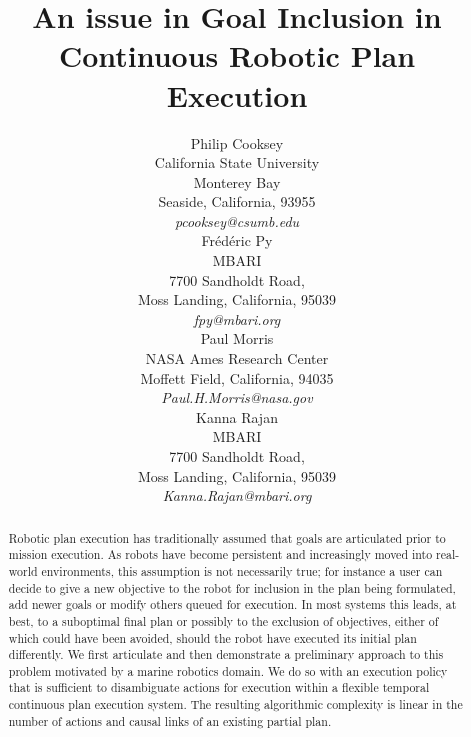 \documentclass[letterpaper]{article}
\begin{document}
\title{An issue in Goal Inclusion in Continuous Robotic Plan Execution}
\author{Philip Cooksey\\
\small{California State University}\\ 
\small{Monterey Bay}\\
\small{Seaside, California, 93955}\\
\small{\emph{pcooksey@csumb.edu}}\\
\And Fr\'ed\'eric Py\\
\small{MBARI}\\
\small{7700 Sandholdt Road,}\\
\small{Moss Landing, California, 95039}\\
\small{\emph{fpy@mbari.org}}\\
\And Paul Morris\\
\small{NASA Ames Research Center}\\
\small{Moffett Field, California, 94035}\\
\small{\emph{Paul.H.Morris@nasa.gov}}\\
\And Kanna Rajan\\
\small{MBARI}\\
\small{7700 Sandholdt Road,}\\
\small{Moss Landing, California, 95039}\\
\small{\emph{Kanna.Rajan@mbari.org}}\\
}

\maketitle{}

\begin{abstract}

  Robotic plan execution has traditionally assumed that goals are
  articulated prior to mission execution. As robots have become
  persistent and increasingly moved into real-world environments, this
  assumption is not necessarily true; for instance a user can decide
  to give a new objective to the robot for inclusion in the plan being
  formulated, add newer goals or modify others queued for
  execution. In most systems this leads, at best, to a suboptimal
  final plan or possibly to the exclusion of objectives, either of
  which could have been avoided, should the robot have executed its
  initial plan differently.  We first articulate and then demonstrate
  a preliminary approach to this problem motivated by a marine
  robotics domain. We do so with an execution policy that is
  sufficient to disambiguate actions for execution within a flexible
  temporal continuous plan execution system.  The resulting
  algorithmic complexity is linear in the number of actions and causal
  links of an existing partial plan.

\end{abstract}






 






\footnotesize{


}
\end{document}
